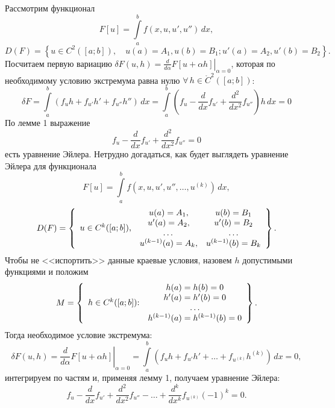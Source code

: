 \documentclass[12pt,a5paper]{book}
\begin{document}
	\noindent Рассмотрим функционал
	\begin{equation*}
		F[u] = \int\limits_a^b f(x, u, u', u'')\,dx,
	\end{equation*}
	\begin{equation*}
		D(F) = \left\{u \in C^2([a;b]), \quad u(a) = A_1, u(b) = B_1; u'(a) = A_2, u'(b) = B_2\right\}.
	\end{equation*}
	Посчитаем первую вариацию $\delta F(u,h) = \left.\frac{d}{d\alpha}F[u + \alpha h]\right|_{\alpha=0}$, которая по необходимому условию экстремума равна нулю $\forall\,h \in \mathring{C}^2([a;b])$:
	\begin{equation*}
		\delta F = \int\limits_a^b \left(f_uh + f_{u'}h' + f_{u''}h''\right)\,dx = \int\limits_a^b \left(f_u - \frac{d}{dx}f_{u'} + \frac{d^2}{dx^2}f_{u''}\right)h\,dx = 0
	\end{equation*}
	По лемме 1 выражение
	\begin{equation*}
		f_u - \frac{d}{dx}f_{u'} + \frac{d^2}{dx^2}f_{u''} = 0
	\end{equation*}
	есть уравнение Эйлера. Нетрудно догадаться, как будет выглядеть уравнение Эйлера для функционала
	\begin{equation*}
		F[u] = \int\limits_a^b f(x, u, u', u'', \dots, u^{(k)})\,dx,
	\end{equation*}
	\begin{equation*}
		D(F) = \left\{
		\begin{array}{lcc}
			\multirow{4}{*}{$u \in C^k([a;b])$,} & u(a) = A_1, & u(b) = B_1 \\
			& u'(a) = A_2, & u'(b) = B_2 \\
			& \dots & \dots \\
			& u^{(k-1)}(a) = A_k, & u^{(k-1)}(b) = B_k
		\end{array}
		\right\}.
	\end{equation*}
	Чтобы не <<испортить>> данные краевые условия, назовем $h$ допустимыми функциями и положим
	\begin{equation*}
		M = \left\{
		\begin{array}{lc}
			\multirow{4}{*}{$h \in C^k([a;b])$:} & h(a) = h(b) = 0 \\
			& h'(a) = h'(b) = 0 \\
			& \dots \\
			& h^{(k-1)}(a) = h^{(k-1)}(b) = 0
		\end{array}
		\right\}.
	\end{equation*}
	Тогда необходимое условие экстремума:
	\begin{equation*}
		\delta F(u,h) = \left.\frac{d}{d\alpha}F[u + \alpha h]\right|_{\alpha=0} = \int\limits_a^b \left(f_uh + f_{u'}h' + \dots + f_{u^{(k)}}h^{(k)}\right)\,dx = 0,
	\end{equation*}
	интегрируем по частям и, применяя лемму 1, получаем уравнение Эйлера:
	\begin{equation*}
		f_u - \frac{d}{dx}f_{u'} + \frac{d^2}{dx^2}f_{u''} - \dots + \frac{d^k}{dx^k}f_{u^{(k)}}(-1)^k = 0.
	\end{equation*}
	
\end{document}
